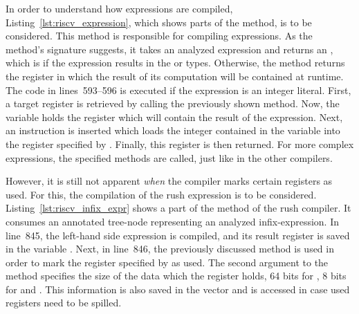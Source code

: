 
In order to understand how expressions are compiled, Listing~\ref{lst:riscv_expression}, which shows parts of the  method, is to be considered.
This method is responsible for compiling expressions.
As the method's signature suggests, it takes an analyzed expression and returns an ,
which is  if the expression results in the \qVerb{!} or \qVerb{()} types.
Otherwise, the method returns the register in which the result of its computation will be contained at runtime.
The code in lines~593--596 is executed if the expression is an integer literal.
First, a target register is retrieved by calling the previously shown  method.
Now, the  variable holds the register which will contain the result of the expression.
Next, an  instruction is inserted which loads the integer contained in the variable  into the register specified by .
Finally, this register is then returned.
For more complex expressions, the specified methods are called, just like in the other compilers.


However, it is still not apparent \emph{when} the compiler marks certain registers as used.
For this, the compilation of the rush expression  is to be considered.
Listing~\ref{lst:riscv_infix_expr} shows a part of the  method of the rush compiler.
It consumes an annotated tree-node representing an analyzed infix-expression.
In line~845, the left-hand side expression is compiled, and its result register is saved in the variable .
Next, in line~846, the previously discussed  method is used in order to mark the register specified by  as used.
The second argument to the method specifies the size of the data which the register holds, 64 bits for , 8 bits for  and .
This information is also saved in the  vector and is accessed in case used registers need to be spilled.

